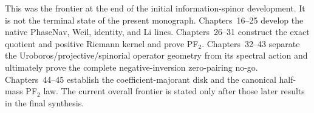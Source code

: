 This was the frontier at the end of the initial information-spinor development. It is not the terminal state of the present monograph. Chapters~16--25 develop the native PhaseNav, Weil, identity, and Li lines. Chapters~26--31 construct the exact quotient and positive Riemann kernel and prove PF$_2$. Chapters~32--43 separate the Uroboros/projective/spinorial operator geometry from its spectral action and ultimately prove the complete negative-inversion zero-pairing no-go. Chapters~44--45 establish the coefficient-majorant disk and the canonical half-mass PF$_2$ law. The current overall frontier is stated only after those later results in the final synthesis.

